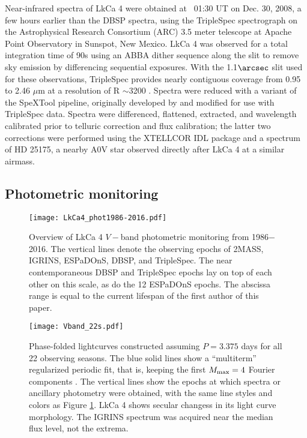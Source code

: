 \documentclass[twocolumn]{emulateapj}%
\newcommand{\name}{LkCa 4 }
\begin{document}
Near-infrared spectra of LkCa 4 were obtained at ~01:30 UT on Dec. 30, 2008, a few hours earlier than the DBSP spectra, using the TripleSpec spectrograph on the Astrophysical Research Consortium (ARC) 3.5 meter telescope at Apache Point Observatory in Sunspot, New Mexico. LkCa 4 was observed for a total integration time of 90s using an ABBA dither sequence along the slit to remove sky emission by differencing sequential exposures.  With the 1.1$\arcsec$ slit used for these observations, TripleSpec provides nearly contiguous coverage from 0.95 to 2.46 $\mu$m at a resolution of  R $\sim$3200 \citep{wilson04}. Spectra were reduced with a variant of the SpeXTool pipeline, originally developed by \citet{cushing04} and modified for use with TripleSpec data. Spectra were differenced, flattened, extracted, and wavelength calibrated prior to telluric correction and flux calibration; the latter two corrections were performed using the XTELLCOR IDL package \citep{vacca03} and a spectrum of HD 25175, a nearby A0V star observed directly after LkCa 4 at a similar airmass. 


\subsection{Photometric monitoring}

\begin{figure*}
 \centering
 \texttt{[image: LkCa4\_phot1986-2016.pdf]}
 \caption{Overview of \name $V-$band photometric monitoring from 1986$-$2016.  The vertical lines denote the observing epochs of 2MASS, IGRINS, ESPaDOnS, DBSP, and TripleSpec.  The near contemporaneous DBSP and TripleSpec epochs lay on top of each other on this scale, as do the 12 ESPaDOnS epochs.  The abscissa range is equal to the current lifespan of the first author of this paper.}
 \label{fig:PhotTime}
\end{figure*}

\begin{figure*}
 \centering
 \texttt{[image: Vband\_22s.pdf]}
 \caption{Phase-folded lightcurves constructed assuming $P=3.375$ days for all 22 observing seasons.  The blue solid lines show a ``multiterm'' regularized periodic fit, that is, keeping the first $M_{\rm max}=4$ Fourier components \citep{vanderplas15a}.  The vertical lines show the epochs at which spectra or ancillary photometry were obtained, with the same line styles and colors as Figure \ref{fig:PhotTime}.  LkCa 4 shows secular changess in its light curve morphology.  The IGRINS spectrum was acquired near the median flux level, not the extrema.}
 \label{fig:PhotPhase}
\end{figure*}
\end{document}
